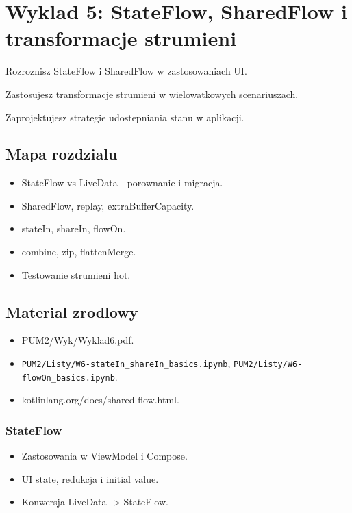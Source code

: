\chapter{Wyklad 5: StateFlow, SharedFlow i transformacje strumieni}

\begin{learningobjectives}
  \item Rozroznisz StateFlow i SharedFlow w zastosowaniach UI.
  \item Zastosujesz transformacje strumieni w wielowatkowych scenariuszach.
  \item Zaprojektujesz strategie udostepniania stanu w aplikacji. 
\end{learningobjectives}

\section{Mapa rozdzialu}
\begin{itemize}
  \item StateFlow vs LiveData - porownanie i migracja.
  \item SharedFlow, replay, extraBufferCapacity.
  \item stateIn, shareIn, flowOn.
  \item combine, zip, flattenMerge.
  \item Testowanie strumieni hot.
\end{itemize}

\section{Material zrodlowy}
\begin{itemize}
  \item PUM2/Wyk/Wyklad6.pdf.
  \item \texttt{PUM2/Listy/W6-stateIn\_shareIn\_basics.ipynb}, \texttt{PUM2/Listy/W6-flowOn\_basics.ipynb}.
  \item kotlinlang.org/docs/shared-flow.html.
\end{itemize}

\subsection{StateFlow}
\begin{itemize}
  \item Zastosowania w ViewModel i Compose.
  \item UI state, redukcja i initial value.
  \item Konwersja LiveData -> StateFlow.
\end{itemize}

